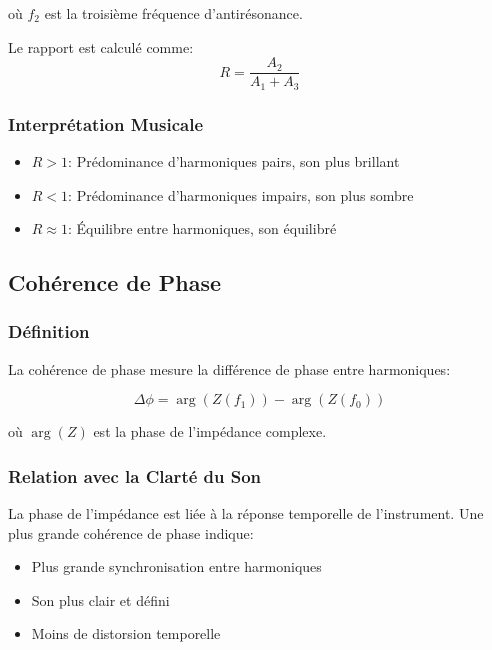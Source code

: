 \documentclass[12pt,a4paper,twocolumn]{article}
\newcommand{\impedance}{Z}
\newcommand{\freqzero}{f_0}
\newcommand{\freqone}{f_1}
\newcommand{\freqtwo}{f_2}
\begin{document}
où $\freqtwo$ est la troisième fréquence d'antirésonance.

Le rapport est calculé comme:
\begin{equation}
R = \frac{A_2}{A_1 + A_3}
\label{eq:ratio_calcul}
\end{equation}

\subsubsection{Interprétation Musicale}

\begin{itemize}
    \item \textbf{$R > 1$}: Prédominance d'harmoniques pairs, son plus brillant
    \item \textbf{$R < 1$}: Prédominance d'harmoniques impairs, son plus sombre
    \item \textbf{$R \approx 1$}: Équilibre entre harmoniques, son équilibré
\end{itemize}

\subsection{Cohérence de Phase}

\subsubsection{Définition}

La cohérence de phase mesure la différence de phase entre harmoniques:

\begin{equation}
\Delta\phi = \arg(\impedance(\freqone)) - \arg(\impedance(\freqzero))
\label{eq:phase_coherence}
\end{equation}

où $\arg(\impedance)$ est la phase de l'impédance complexe.

\subsubsection{Relation avec la Clarté du Son}

La phase de l'impédance est liée à la réponse temporelle de l'instrument. Une plus grande cohérence de phase indique:

\begin{itemize}
    \item Plus grande synchronisation entre harmoniques
    \item Son plus clair et défini
    \item Moins de distorsion temporelle
\end{itemize}
\end{document}
